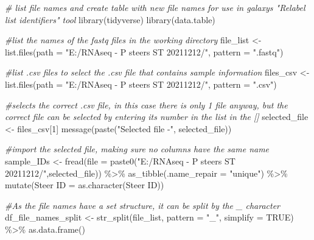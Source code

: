 \documentclass[
]{book}
\newenvironment{Shaded}{\begin{snugshade}}{\end{snugshade}}
\newcommand{\AttributeTok}[1]{\textcolor[rgb]{0.77,0.63,0.00}{#1}}
\newcommand{\CommentTok}[1]{\textcolor[rgb]{0.56,0.35,0.01}{\textit{#1}}}
\newcommand{\ConstantTok}[1]{\textcolor[rgb]{0.00,0.00,0.00}{#1}}
\newcommand{\DecValTok}[1]{\textcolor[rgb]{0.00,0.00,0.81}{#1}}
\newcommand{\FunctionTok}[1]{\textcolor[rgb]{0.00,0.00,0.00}{#1}}
\newcommand{\NormalTok}[1]{#1}
\newcommand{\OtherTok}[1]{\textcolor[rgb]{0.56,0.35,0.01}{#1}}
\newcommand{\SpecialCharTok}[1]{\textcolor[rgb]{0.00,0.00,0.00}{#1}}
\newcommand{\StringTok}[1]{\textcolor[rgb]{0.31,0.60,0.02}{#1}}
\begin{document}
\begin{Shaded}
\begin{Highlighting}[]
\CommentTok{\# list file names and create table with new file names for use in galaxy\textquotesingle{}s "Relabel list identifiers" tool}
\FunctionTok{library}\NormalTok{(tidyverse)}
\FunctionTok{library}\NormalTok{(data.table)}

\CommentTok{\#list the names of the fastq files in the working directory}
\NormalTok{file\_list }\OtherTok{\textless{}{-}} \FunctionTok{list.files}\NormalTok{(}\AttributeTok{path =} \StringTok{"E:/RNAseq {-} P steers ST 20211212/"}\NormalTok{, }\AttributeTok{pattern =} \StringTok{".fastq"}\NormalTok{)}

\CommentTok{\#list .csv files to select the .csv file that contains sample information}
\NormalTok{files\_csv }\OtherTok{\textless{}{-}} \FunctionTok{list.files}\NormalTok{(}\AttributeTok{path =} \StringTok{"E:/RNAseq {-} P steers ST 20211212/"}\NormalTok{, }\AttributeTok{pattern =} \StringTok{".csv"}\NormalTok{)}

\CommentTok{\#selects the correct .csv file, in this case there is only 1 file anyway, but the correct file can be selected by entering it\textquotesingle{}s number in the list in the []}
\NormalTok{selected\_file }\OtherTok{\textless{}{-}}\NormalTok{ files\_csv[}\DecValTok{1}\NormalTok{]}
\FunctionTok{message}\NormalTok{(}\FunctionTok{paste}\NormalTok{(}\StringTok{"Selected file {-}"}\NormalTok{, selected\_file))}

\CommentTok{\#import the selected file, making sure no columns have the same name}
\NormalTok{sample\_IDs }\OtherTok{\textless{}{-}} \FunctionTok{fread}\NormalTok{(}\AttributeTok{file =} \FunctionTok{paste0}\NormalTok{(}\StringTok{"E:/RNAseq {-} P steers ST 20211212/"}\NormalTok{,selected\_file)) }\SpecialCharTok{\%\textgreater{}\%} 
  \FunctionTok{as\_tibble}\NormalTok{(}\AttributeTok{.name\_repair =} \StringTok{"unique"}\NormalTok{) }\SpecialCharTok{\%\textgreater{}\%} 
  \FunctionTok{mutate}\NormalTok{(}\StringTok{\textasciigrave{}}\AttributeTok{Steer ID}\StringTok{\textasciigrave{}} \OtherTok{=} \FunctionTok{as.character}\NormalTok{(}\StringTok{\textasciigrave{}}\AttributeTok{Steer ID}\StringTok{\textasciigrave{}}\NormalTok{)) }


\CommentTok{\#As the file names have a set structure, it can be split by the \_ character}
\NormalTok{df\_file\_names\_split }\OtherTok{\textless{}{-}} \FunctionTok{str\_split}\NormalTok{(file\_list, }\AttributeTok{pattern =} \StringTok{"\_"}\NormalTok{, }\AttributeTok{simplify =} \ConstantTok{TRUE}\NormalTok{) }\SpecialCharTok{\%\textgreater{}\%} \FunctionTok{as.data.frame}\NormalTok{()}


\end{Highlighting}
\end{Shaded}
\end{document}
